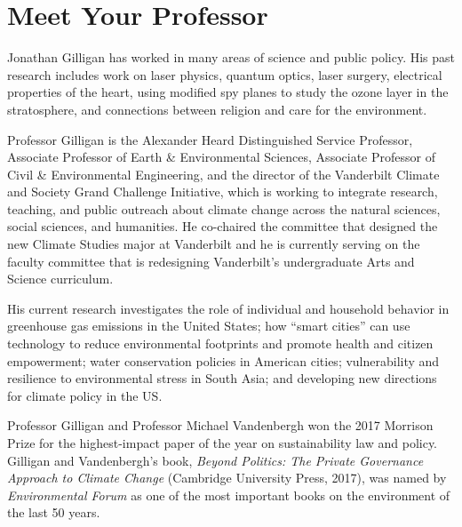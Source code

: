 \documentclass[11pt]{jgsyllabus}\usepackage[]{graphicx}\usepackage[]{xcolor}
\begin{document}
\section{Meet Your Professor}
Jonathan Gilligan has worked in many areas of science and public policy.
His past research includes work on laser physics, quantum optics,
laser surgery, electrical properties of the heart, using modified spy planes to
study the ozone layer in the stratosphere, and connections between religion and
care for the environment.
\iffalse

Professor Gilligan joined the Vanderbilt Faculty in 1994 as a member of the
Department of Physics and Astronomy. In 2003, when the Department of Geology
became the Department of Earth and Environmental Science, Professor Gilligan
joined the new department to focus on atmospheric science, global climate change,
and the interactions of politics, ethics, religion, communication, and the
environment.
\fi

Professor Gilligan is
the Alexander Heard Distinguished Service Professor,
Associate Professor of Earth \& Environmental Sciences,
Associate Professor of Civil \& Environmental Engineering, and
the director of the Vanderbilt Climate and Society Grand Challenge Initiative,
which is working to integrate research, teaching, and public outreach about
climate change across the natural sciences, social sciences, and humanities.
He co-chaired the committee that designed the new Climate Studies major at
Vanderbilt and he is currently serving on the faculty committee that is
redesigning Vanderbilt's undergraduate Arts and Science curriculum.

His current research investigates the role of individual and household behavior
in greenhouse gas emissions in the United States;
how ``smart cities'' can use technology to reduce environmental footprints and
promote health and citizen empowerment;
water conservation policies in American cities;
vulnerability and resilience to environmental stress in South Asia;
and developing new directions for climate policy in the US.

Professor Gilligan and Professor Michael Vandenbergh won
the 2017 Morrison Prize for the highest-impact paper of the year
on sustainability law and policy.
Gilligan and Vandenbergh's book, %
\emph{Beyond Politics: The Private Governance Approach to Climate Change\/}
(Cambridge University Press, 2017),
was named by \emph{Environmental Forum\/} as one of the most
important books on the environment of the last 50 years.
\end{document}
